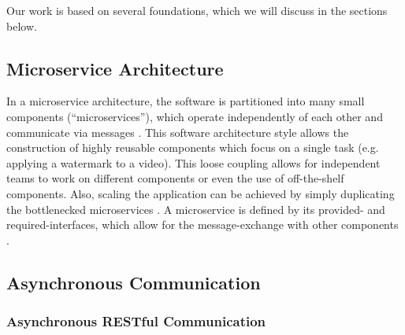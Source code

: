 Our work is based on several foundations, which we will discuss in the sections below.

\subsection{Microservice Architecture}
\label{sec:Foundation:MicroserviceArchitecture}
In a microservice architecture, the software is partitioned into many small components (``microservices''), which operate independently of each other and communicate via messages \cite{Dragoni2017}.
This software architecture style allows the construction of highly reusable components which focus on a single task (e.g. applying a watermark to a video).
This loose coupling allows for independent teams to work on different components or even the use of off-the-shelf components.
Also, scaling the application can be achieved by simply duplicating the bottlenecked microservices \cite{Dragoni2017}.
A microservice is defined by its provided- and required-interfaces, which allow for the message-exchange with other components \cite{Singh2021}.

\subsection{Asynchronous Communication}
\label{sec:Foundation:AsyncCommunication}


\subsubsection{Asynchronous RESTful Communication}
\label{sec:Foundation:AsyncCommunication:REST}
%  

